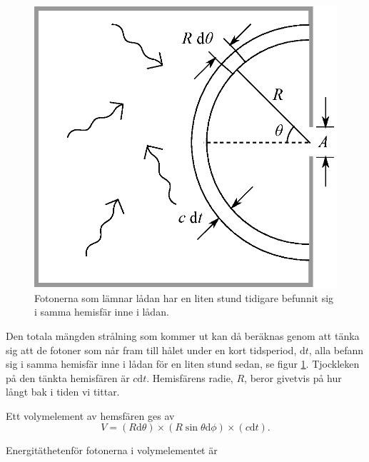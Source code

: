 \begin{figure}[hpbt]
\centering
\includegraphics[height=0.3\textheight]{images/blackbody_box.eps}
\caption{\label{fig:box}{Fotonerna som lämnar lådan har en liten stund tidigare befunnit sig i samma hemisfär inne i lådan.}}
\end{figure}

Den totala mängden strålning som kommer ut kan då beräknas genom att tänka sig att de fotoner som når fram till hålet under en kort tidsperiod, $\mathrm{d}t$, alla befann sig i samma hemisfär inne i lådan för en liten stund sedan, se figur \ref{fig:box}. Tjockleken på den tänkta hemisfären är $c\mathrm{d}t$. Hemisfärens radie, $R$, beror givetvis på hur långt bak i tiden vi tittar.

Ett volymelement av hemsfären ges av
\begin{equation}
V=(R\mathrm{d}\theta) \times (R\sin\theta\mathrm{d}\phi) \times (c \mathrm{d}t).
\end{equation}

Energitäthetenför fotonerna i volymelementet är 


